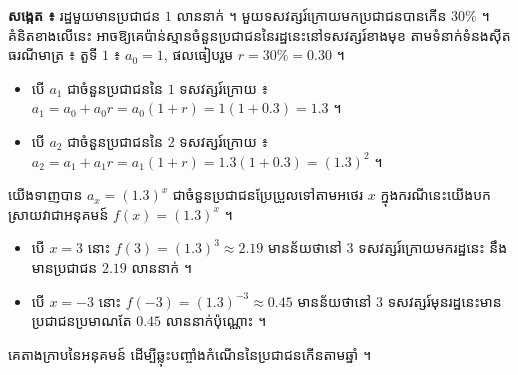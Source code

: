 \textbf{សង្កេត ៖} រដ្ឋមួយមានប្រជាជន $1$ លាននាក់ ។ មួយទសវត្សរ៍ក្រោយមកប្រជាជនបានកើន $30\%$ ។ គំនិតខាងលើនេះ អាចឱ្យគេប៉ាន់ស្មានចំនួនប្រជាជននៃរដ្ឋនេះនៅទសវត្សរ៍ខាងមុខ តាមទំនាក់ទំនងស៊ីតធរណីមាត្រ ៖ តួទី $1$ ៖ $a_0 = 1$, ផលធៀបរួម $r = 30\% = 0.30$ ។
\begin{itemize}
  \item បើ $a_1$ ជាចំនួនប្រជាជននៃ $1$ ទសវត្សរ៍ក្រោយ ៖ $a_1 = a_0 + a_0r = a_0(1 + r) = 1(1 + 0.3) = 1.3$ ។
  \item បើ $a_2$ ជាចំនួនប្រជាជននៃ $2$ ទសវត្សរ៍ក្រោយ ៖ $a_2 = a_1 + a_1r = a_1(1 + r) = 1.3(1 + 0.3) = (1.3)^2$ ។
\end{itemize}
យើងទាញបាន $a_x = (1.3)^x$ ជាចំនួនប្រជាជនប្រែប្រួលទៅតាមអថេរ $x$ ក្នុងករណីនេះយើងបកស្រាយវាជាអនុគមន៍ $f(x) = (1.3)^x$ ។
\begin{itemize}
  \item បើ $x = 3$ នោះ $f(3) = (1.3)^3 \approx 2.19$ មានន័យថានៅ $3$ ទសវត្សរ៍ក្រោយមករដ្ឋនេះ នឹងមានប្រជាជន $2.19$ លាននាក់ ។
  \item បើ $x = -3$ នោះ $f(-3) = (1.3)^{-3} \approx 0.45$ មានន័យថានៅ $3$ ទសវត្សរ៍មុនរដ្ឋនេះមានប្រជាជនប្រមាណតែ $0.45$ លាននាក់ប៉ុណ្ណោះ ។
\end{itemize}
គេតាងក្រាបនៃអនុគមន៍ ដើម្បីឆ្លុះបញ្ចាំងកំណើននៃប្រជាជនកើនតាមឆ្នាំ ។
\begin{center}
\end{center}

